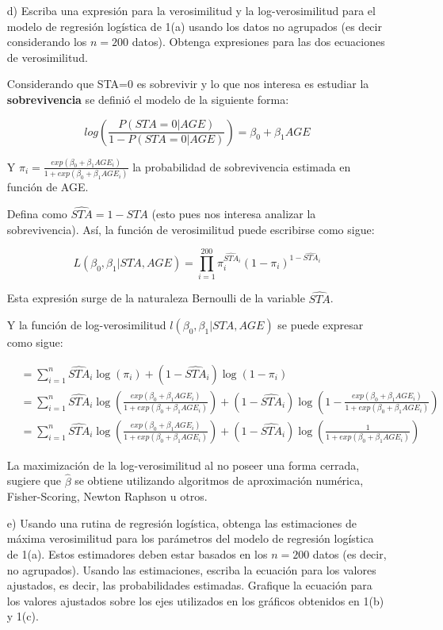 \documentclass[11pt,onside]{article}
\begin{document}
\begin{itemize}
\item[d)] Escriba una expresión para la verosimilitud y la log-verosimilitud para el modelo de regresión logística de 1(a) usando los datos no agrupados (es decir considerando los $n=200$ datos). Obtenga expresiones para las dos ecuaciones de verosimilitud.

Considerando que STA=0 es sobrevivir y lo que nos interesa es estudiar la \textbf{sobrevivencia} se definió el modelo de la siguiente forma:

$$log \left( \frac{P(STA=0|AGE)}{1-P(STA=0|AGE)} \right)=\beta_{0}+\beta_{1}AGE$$ 

Y $\pi_{i}=\frac{exp(\beta_{0}+\beta_{1}AGE_{i})} {1+exp(\beta_{0}+\beta_{1}AGE_{i})}$ la probabilidad de sobrevivencia estimada en función de AGE.

Defina como $\widehat{STA}=1-STA$ (esto pues nos interesa analizar la sobrevivencia). Así, la función de verosimilitud puede escribirse como sigue:

\[
L\left(\beta_{0}, \beta_{1} |STA, AGE \right)=\prod_{i=1}^{200} \pi_{i}^{\widehat{STA}_{i}}\left(1-\pi_{i}\right)^{1-\widehat{STA}_{i}}
\]

Esta expresión surge de la naturaleza Bernoulli de la variable $\widehat{STA}$.


Y la función de log-verosimilitud $ l\left(\beta_{0}, \beta_{1} |STA, AGE \right)$ se puede expresar como sigue:

$\begin{aligned} &=\sum_{i=1}^{n} \widehat{STA}_{i} \log \left(\pi_{i}\right)+\left(1-\widehat{STA}_{i}\right) \log \left(1-\pi_{i}\right) \\ 
&=\sum_{i=1}^{n} \widehat{STA}_{i} \log \left(\frac{exp(\beta_{0}+\beta_{1}AGE_{i})} {1+exp(\beta_{0}+\beta_{1}AGE_{i})} \right)+\left(1-\widehat{STA}_{i}\right) \log \left(1-\frac{exp(\beta_{0}+\beta_{1}AGE_{i})} {1+exp(\beta_{0}+\beta_{1}AGE_{i})} \right) \\
&=\sum_{i=1}^{n} \widehat{STA}_{i} \log \left(\frac{exp(\beta_{0}+\beta_{1}AGE_{i})} {1+exp(\beta_{0}+\beta_{1}AGE_{i})} \right)+\left(1-\widehat{STA}_{i}\right) \log \left( \frac{1} {1+exp(\beta_{0}+\beta_{1}AGE_{i})} \right) 
 \end{aligned}$
 
La maximización de la log-verosimilitud al no poseer una forma cerrada, sugiere que $\hat{\beta}$ se obtiene utilizando algoritmos de aproximación numérica, Fisher-Scoring, Newton Raphson u otros.
 
\item[e)] Usando una rutina de regresión logística, obtenga las estimaciones de máxima verosimilitud para los parámetros del modelo de regresión logística de 1(a). Estos estimadores deben estar basados en los $n=200$ datos (es decir, no agrupados). Usando las estimaciones, escriba la ecuación para los valores ajustados, es decir, las probabilidades estimadas. Grafique la ecuación para los valores ajustados sobre los ejes utilizados en los gráficos obtenidos en  1(b) y 1(c).



\end{itemize}
\end{document}

